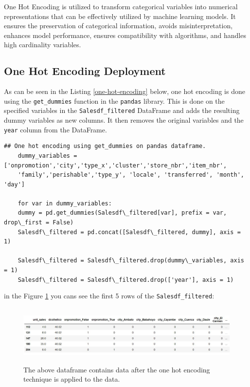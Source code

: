 One Hot Encoding is utilized to transform categorical variables into numerical representations that can be effectively utilized by machine learning models. It ensures the preservation of categorical information, avoids misinterpretation, enhances model performance, ensures compatibility with algorithms, and handles high cardinality variables.

\subsection{One Hot Encoding Deployment}

As can be seen in the Listing \ref{one-hot-encoding} below, one hot encoding is done using the \lstinline{get_dummies} function in the \lstinline{pandas} library. This is  done on the specified variables in the \lstinline{Salesdf_filtered} DataFrame and adds the resulting dummy variables as new columns. It then removes the original variables and the \lstinline{year} column from the DataFrame.


\begin{lstlisting}[label=one-hot-encoding, caption=One hot encoding using get\_dummies on pandas dataframe]
	## One hot encoding using get_dummies on pandas dataframe.
	dummy_variables = ['onpromotion','city','type_x','cluster','store_nbr','item_nbr',
	'family','perishable','type_y', 'locale', 'transferred', 'month', 'day']
	
	for var in dummy_variables:
	dummy = pd.get_dummies(Salesdf\_filtered[var], prefix = var, drop\_first = False)
	Salesdf\_filtered = pd.concat([Salesdf\_filtered, dummy], axis = 1)
	
	Salesdf\_filtered = Salesdf\_filtered.drop(dummy\_variables, axis = 1)
	Salesdf\_filtered = Salesdf\_filtered.drop(['year'], axis = 1)
\end{lstlisting}

in the Figure \ref{Fig:Transformation} you cans see the first 5 rows of the \lstinline{Salesdf_filtered}:

\begin{center}
	\begin{figure}[h!]
		\begin{center}
			\includegraphics[height=30mm, width=130mm]{Images/Transformation}
		\end{center}
		\caption{The above dataframe contains data after the one hot encoding technique is applied to the data.} 
		\label{Fig:Transformation}
	\end{figure}
\end{center}

